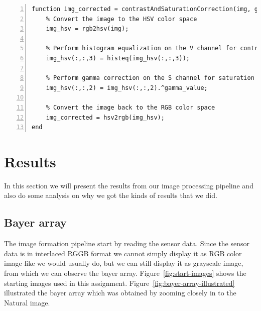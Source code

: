 \documentclass[12pt,a4paper,english
]{tunithesis}
\begin{document}
\begin{lstlisting}[style=Matlab-editor, numbers=left, basicstyle=\footnotesize]
function img_corrected = contrastAndSaturationCorrection(img, gamma_value)
    % Convert the image to the HSV color space
    img_hsv = rgb2hsv(img);

    % Perform histogram equalization on the V channel for contrast correction
    img_hsv(:,:,3) = histeq(img_hsv(:,:,3));

    % Perform gamma correction on the S channel for saturation correction
    img_hsv(:,:,2) = img_hsv(:,:,2).^gamma_value;

    % Convert the image back to the RGB color space
    img_corrected = hsv2rgb(img_hsv);
end
\end{lstlisting}


\chapter{Results}
\label{sec:results}
In this section we will present the results from our image processing pipeline and also do some analysis on why we got the kinds of results that we did.

\section{Bayer array}
The image formation pipeline start by reading the sensor data. Since the sensor data is in interlaced RGGB format we cannot simply display it as RGB color image like we would usually do, but we can still display it as grayscale image, from which we can observe the bayer array. Figure~\ref{fig:start-images} shows the starting images used in this assignment. Figure~\ref{fig:bayer-array-illustrated} illustrated the bayer array which was obtained by zooming closely in to the Natural image.
\end{document}
